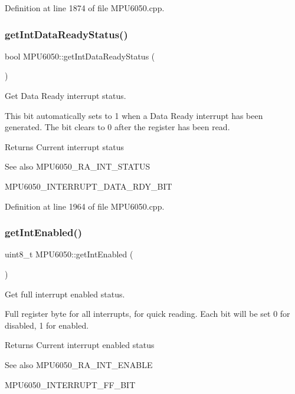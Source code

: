 Definition at line 1874 of file M\+P\+U6050.\+cpp.

\mbox{\label{classMPU6050_ae4f434eb51a15b536e2e8f89a776872b}} 
\subsubsection{\texorpdfstring{getIntDataReadyStatus()}{getIntDataReadyStatus()}}
{\footnotesize\ttfamily bool M\+P\+U6050\+::get\+Int\+Data\+Ready\+Status (\begin{DoxyParamCaption}{ }\end{DoxyParamCaption})}



Get Data Ready interrupt status. 

This bit automatically sets to 1 when a Data Ready interrupt has been generated. The bit clears to 0 after the register has been read. \begin{DoxyReturn}{Returns}
Current interrupt status 
\end{DoxyReturn}
\begin{DoxySeeAlso}{See also}
M\+P\+U6050\+\_\+\+R\+A\+\_\+\+I\+N\+T\+\_\+\+S\+T\+A\+T\+US 

M\+P\+U6050\+\_\+\+I\+N\+T\+E\+R\+R\+U\+P\+T\+\_\+\+D\+A\+T\+A\+\_\+\+R\+D\+Y\+\_\+\+B\+IT 
\end{DoxySeeAlso}


Definition at line 1964 of file M\+P\+U6050.\+cpp.

\mbox{\label{classMPU6050_a295c9600579557df065aff88bc7a1d83}} 
\subsubsection{\texorpdfstring{getIntEnabled()}{getIntEnabled()}}
{\footnotesize\ttfamily uint8\+\_\+t M\+P\+U6050\+::get\+Int\+Enabled (\begin{DoxyParamCaption}{ }\end{DoxyParamCaption})}



Get full interrupt enabled status. 

Full register byte for all interrupts, for quick reading. Each bit will be set 0 for disabled, 1 for enabled. \begin{DoxyReturn}{Returns}
Current interrupt enabled status 
\end{DoxyReturn}
\begin{DoxySeeAlso}{See also}
M\+P\+U6050\+\_\+\+R\+A\+\_\+\+I\+N\+T\+\_\+\+E\+N\+A\+B\+LE 

M\+P\+U6050\+\_\+\+I\+N\+T\+E\+R\+R\+U\+P\+T\+\_\+\+F\+F\+\_\+\+B\+IT 
\end{DoxySeeAlso}


